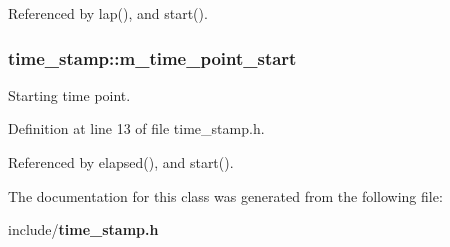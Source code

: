 Referenced by lap(), and start().

\subsubsection[{m\-\_\-time\-\_\-point\-\_\-start}]{ time\-\_\-stamp\-::m\-\_\-time\-\_\-point\-\_\-start\hspace{0.3cm}{\ttfamily [private]}}\label{d2/d9d/classtime__stamp_a3e6b5219f5acb2f04b1fa1a87dc74555}


Starting time point. 



Definition at line 13 of file time\-\_\-stamp.\-h.



Referenced by elapsed(), and start().



The documentation for this class was generated from the following file\-:\begin{DoxyCompactItemize}
\item 
include/{\bf time\-\_\-stamp.\-h}\end{DoxyCompactItemize}

